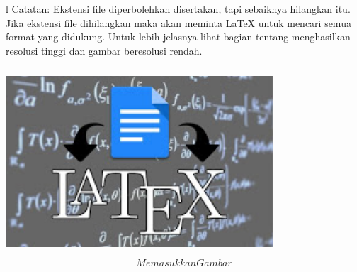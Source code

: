 \vspace{12pt}l
\vspace{12pt}
\noindent 
Catatan: Ekstensi file diperbolehkan disertakan, tapi sebaiknya hilangkan itu. Jika ekstensi file dihilangkan maka akan meminta LaTeX untuk mencari semua format yang didukung. Untuk lebih jelasnya lihat bagian tentang menghasilkan resolusi tinggi dan gambar beresolusi rendah. \par
\vspace{12pt}
\vspace{12pt}
\noindent 

\includegraphics[width=10cm,height=7cm]{gambar/dapi14.jpg}
\begin{equation}Memasukkan Gambar \end{equation}


